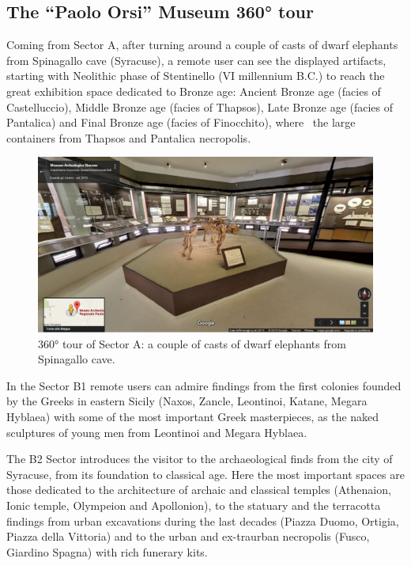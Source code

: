 \documentclass[amsthm,ebook]{saparticle}
\begin{document}
\subsection{The ``Paolo Orsi'' Museum 360° tour}


Coming from Sector A, after turning around a couple of casts of dwarf elephants from Spinagallo cave (Syracuse), a
remote user can see the displayed artifacts, starting with Neolithic phase of Stentinello (VI millennium B.C.) to reach
the great exhibition space dedicated to Bronze age: Ancient Bronze age (facies of Castelluccio), Middle Bronze age
(facies of Thapsos), Late Bronze age (facies of Pantalica) and Final Bronze age (facies of Finocchito), where \ the
large containers from Thapsos and Pantalica necropolis.

\begin{figure}[!bp]
\centering
 \includegraphics[width=\columnwidth]{EAGLE2016BONACINIPilotprojectatPaoloOrsiMuseum-img002.jpg}
\caption{360° tour of Sector A: a couple of casts of dwarf elephants from Spinagallo cave. }
\label{fig:2}
\end{figure}


In the Sector B1 remote users can admire findings from the first colonies founded by the Greeks in eastern Sicily
(Naxos, Zancle, Leontinoi, Katane, Megara Hyblaea) with some of the most important Greek masterpieces, as the naked
sculptures of young men from Leontinoi and Megara Hyblaea.

The B2 Sector introduces the visitor to the archaeological finds from the city of Syracuse, from its foundation to
classical age. Here the most important spaces are those dedicated to the architecture of archaic and classical temples
(Athenaion, Ionic temple, Olympeion and Apollonion), to the statuary and the terracotta findings from urban excavations
during the last decades (Piazza Duomo, Ortigia, Piazza della Vittoria) and to the urban and ex-traurban necropolis
(Fusco, Giardino Spagna) with rich funerary kits. \ 
\end{document}
